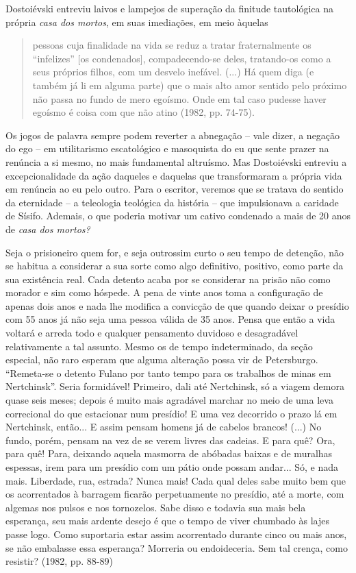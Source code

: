 Dostoiévski entreviu laivos e lampejos de superação da finitude
tautológica na própria \emph{casa dos mortos}, em suas imediações, em
meio àquelas

\begin{quote}
pessoas cuja finalidade na vida se reduz a tratar fraternalmente os
``infelizes'' {[}os condenados{]}, compadecendo-se deles, tratando-os
como a seus próprios filhos, com um desvelo inefável. (...) Há quem diga
(e também já li em alguma parte) que o mais alto amor sentido pelo
próximo não passa no fundo de mero egoísmo. Onde em tal caso pudesse
haver egoísmo é coisa com que não atino (1982, pp. 74-75).
\end{quote}

Os jogos de palavra sempre podem reverter a abnegação -- vale dizer, a
negação do ego -- em utilitarismo escatológico e masoquista do eu que
sente prazer na renúncia a si mesmo, no mais fundamental altruísmo. Mas
Dostoiévski entreviu a excepcionalidade da ação daqueles e daquelas que
transformaram a própria vida em renúncia ao eu pelo outro. Para o
escritor, veremos que se tratava do sentido da eternidade -- a
teleologia teológica da história -- que impulsionava a caridade de
Sísifo. Ademais, o que poderia motivar um cativo condenado a mais de 20
anos de \emph{casa dos mortos? }

Seja o prisioneiro quem for, e seja outrossim curto o seu tempo de
detenção, não se habitua a considerar a sua sorte como algo definitivo,
positivo, como parte da sua existência real. Cada detento acaba por se
considerar na prisão não como morador e sim como hóspede. A pena de
vinte anos toma a configuração de apenas dois anos e nada lhe modifica a
convicção de que quando deixar o presídio com 55 anos já não seja uma
pessoa válida de 35 anos. Pensa que então a vida voltará e arreda todo e
qualquer pensamento duvidoso e desagradável relativamente a tal assunto.
Mesmo os de tempo indeterminado, da seção especial, não raro esperam que
alguma alteração possa vir de Petersburgo. ``Remeta-se o detento Fulano
por tanto tempo para os trabalhos de minas em Nertchinsk''. Seria
formidável! Primeiro, dali até Nertchinsk, só a viagem demora quase seis
meses; depois é muito mais agradável marchar no meio de uma leva
correcional do que estacionar num presídio! E uma vez decorrido o prazo
lá em Nertchinsk, então... E assim pensam homens já de cabelos brancos!
(...) No fundo, porém, pensam na vez de se verem livres das cadeias. E
para quê? Ora, para quê! Para, deixando aquela masmorra de abóbadas
baixas e de muralhas espessas, irem para um presídio com um pátio onde
possam andar... Só, e nada mais. Liberdade, rua, estrada? Nunca mais!
Cada qual deles sabe muito bem que os acorrentados à barragem ficarão
perpetuamente no presídio, até a morte, com algemas nos pulsos e nos
tornozelos. Sabe disso e todavia sua mais bela esperança, seu mais
ardente desejo é que o tempo de viver chumbado às lajes passe logo. Como
suportaria estar assim acorrentado durante cinco ou mais anos, se não
embalasse essa esperança? Morreria ou endoideceria. Sem tal crença, como
resistir? (1982, pp. 88-89)

